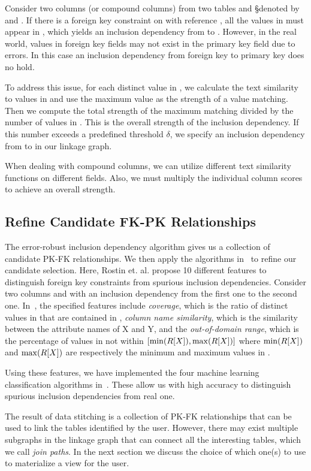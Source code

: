 Consider two columns (or compound columns) from two tables \R and \S denoted by \RX and \SY. If there is a foreign key constraint on \RX with reference \SY, all the values in \RX must appear in \SY, which yields an inclusion dependency from \RX to \SY. However, in the real world, values in foreign key fields may not exist in the primary key field due to errors.  In this case an inclusion dependency from foreign key to primary key does no hold. 

To address this issue, for each distinct value in \RX, we calculate the text similarity to values in \SY and use the maximum value as the strength of a value matching. Then we compute the total strength of the maximum matching divided by the number of values in \RX. This is the overall strength of the inclusion dependency.  If this number exceeds a predefined threshold $\delta$, we specify an inclusion dependency from \RX to \SY in our linkage graph. 

When dealing with compound columns, we can utilize different text similarity functions on different fields. Also, we must multiply the individual column scores to achieve an overall strength.


\subsection{Refine Candidate FK-PK Relationships}\label{subsec:refine}


The error-robust inclusion dependency algorithm gives us a collection of candidate PK-FK relationships. We then apply the algorithms in~\cite{DBLP:conf/webdb/RostinABNL09} to refine our candidate selection. Here, Rostin et. al. propose 10 different features to distinguish foreign key constraints from spurious inclusion dependencies. Consider two columns \RX and \SY with an inclusion dependency from the first one to the second one. In~\cite{DBLP:conf/webdb/RostinABNL09}, the specified features include \emph{coverage}, which is the ratio of distinct values in \RX that are contained in \SY, \emph{column name similarity}, which is the similarity between the attribute names of X and Y, and the \emph{out-of-domain range}, which is the percentage of values in \SY not within $[\min(R[X]), \max(R[X])]$ where $\min(R[X])$ and $\max(R[X])$ are respectively the minimum and maximum values in \RX. 

Using these features, we have implemented the four machine learning classification algorithms in~\cite{DBLP:conf/webdb/RostinABNL09}. These allow us with high accuracy to distinguish spurious inclusion dependencies from real one.

The result of data stitching is a collection of PK-FK relationships that can be used to link the tables identified by the user. However, there may exist multiple subgraphs in the linkage graph that can connect all the interesting tables, which we call \emph{join paths}. In the next section we discuss the choice of which one(s) to use to materialize a view for the user.



